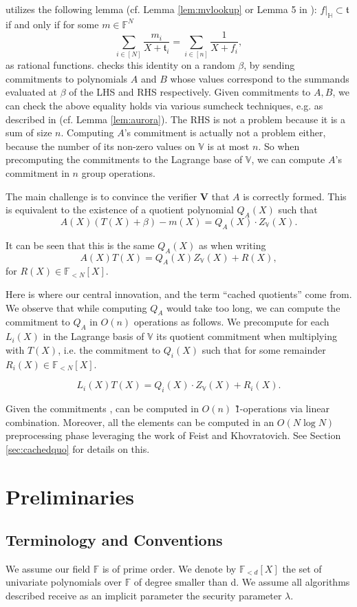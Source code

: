 \documentclass[11pt]{article} %
\newcommand{\F}{\ensuremath{\mathbb F}\xspace}
\newcommand{\ver}{\ensuremath{\mathsf{\mathbf{V}}}\xspace}
\newcommand{\polysofdeg}[1]{\ensuremath{\F_{< #1}[X]}\xspace}
\newcommand{\sumi}[1]{\sum_{i\in[#1]}}
\newcommand{\restricttoset}[2]{\ensuremath{#1|_{#2}}\xspace}
\newcommand{\subspace}{\ensuremath{\mathbb{H}}\xspace}
\newcommand{\bigspace}{\ensuremath{\mathbb{V}}\xspace}
\newcommand{\witsize}{\ensuremath{n}\xspace}
\newcommand{\tabsize}{\ensuremath{N}\xspace}
\newcommand{\tabruntime}{\ensuremath{\tabsize\log\tabsize}\xspace}
\newcommand{\tab}{\ensuremath{\mathfrak{t}}\xspace}
\begin{document}
\cite{mvlookup} utilizes the following lemma (cf. Lemma \ref{lem:mvlookup} or Lemma 5 in \cite{mvlookup}):
$\restricttoset{f}{\subspace}\subset \tab$ if and only if for some $m\in \F^\tabsize$
 \[\sumi{\tabsize}\frac{m_i}{X+\tab_i}=\sumi{\witsize}\frac{1}{X+f_i},\]
 as rational functions.
\cite{mvlookup} checks this identity on a random $\beta$,
by sending commitments to polynomials $A$ and $B$ whose values correspond to the summands evaluated at $\beta$ of the LHS and RHS
respectively.
Given commitments to $A,B$, we can check the above equality holds via various sumcheck techniques, e.g. as described in \cite{aurora} (cf. Lemma \ref{lem:aurora}).
The RHS is not a problem because it is a sum of size \witsize.
Computing $A$'s commitment is actually not a problem either, because the number of its non-zero values on \bigspace
is at most \witsize. So when precomputing the commitments to the Lagrange base of  \bigspace, we can compute $A$'s commitment in  \witsize group operations.

The main challenge is to convince the verifier \ver that $A$ is correctly formed.
This is equivalent to the existence of a quotient polynomial $Q_A(X)$ such that
\[A(X)(T(X)+\beta)-m(X)= Q_A(X)\cdot Z_\bigspace(X).\]

It can be seen that this is the same $Q_A(X)$ as when writing
\[A(X)T(X)=Q_A(X)Z_\bigspace(X) +R(X),\]
for $R(X)\in\polysofdeg{\tabsize}$.

Here is where our central innovation, and the term ``cached quotients'' come from. We observe that while computing 
$Q_A$ would take too long, we can compute the commitment  to $Q_A$ in $O(\witsize)$ operations as follows.
We precompute for each $L_i(X)$ in the Lagrange basis of \bigspace its quotient commitment when multiplying with $T(X)$, i.e.
the commitment to $Q_i(X)$ such that for some remainder $R_i(X)\in \polysofdeg{\tabsize}$.

\[L_i(X)T(X)= Q_i(X)\cdot Z_\bigspace(X) + R_i(X).\]

Given the commitments ,  can be computed in $O(\witsize)$ \G1-operations via linear combination.
Moreover, all the elements  can be computed in an $O(\tabruntime)$ preprocessing phase leveraging the work of Feist and Khovratovich\cite{fastkzgproofsorig}. See Section \ref{sec:cachedquo} for details on this.
\section{Preliminaries}
\subsection{Terminology and Conventions}\label{sec:terminology}
We assume our field \F is of prime order.
We denote by \polysofdeg{d} the set of univariate polynomials over \F of degree smaller than d. 
We assume all algorithms described receive as an implicit parameter the security parameter $\lambda$.
\end{document}
